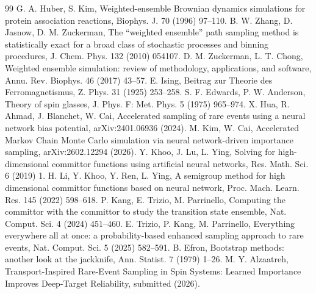 \documentclass[a4paper,fleqn]{cas-sc}
\begin{document}
\begin{thebibliography}{99}
 G. A. Huber, S. Kim, Weighted-ensemble Brownian dynamics
simulations for protein association reactions, Biophys. J. 70 (1996)
97--110.
 B. W. Zhang, D. Jasnow, D. M. Zuckerman, The ``weighted
ensemble'' path sampling method is statistically exact for a broad class of
stochastic processes and binning procedures, J. Chem. Phys. 132 (2010)
054107.
 D. M. Zuckerman, L. T. Chong, Weighted ensemble
simulation: review of methodology, applications, and software, Annu. Rev.
Biophys. 46 (2017) 43--57.
 E. Ising, Beitrag zur Theorie des Ferromagnetismus, Z.
Phys. 31 (1925) 253--258.
 S. F. Edwards, P. W. Anderson, Theory of spin glasses,
J. Phys. F: Met. Phys. 5 (1975) 965--974.
 X. Hua, R. Ahmad, J. Blanchet, W. Cai, Accelerated
sampling of rare events using a neural network bias potential,
arXiv:2401.06936 (2024).
 M. Kim, W. Cai, Accelerated Markov Chain Monte Carlo
simulation via neural network-driven importance sampling, arXiv:2602.12294
(2026).
 Y. Khoo, J. Lu, L. Ying, Solving for high-dimensional
committor functions using artificial neural networks, Res. Math. Sci. 6
(2019) 1.
 H. Li, Y. Khoo, Y. Ren, L. Ying, A semigroup method for
high dimensional committor functions based on neural network, Proc. Mach.
Learn. Res. 145 (2022) 598--618.
 P. Kang, E. Trizio, M. Parrinello, Computing the
committor with the committor to study the transition state ensemble, Nat.
Comput. Sci. 4 (2024) 451--460.
 E. Trizio, P. Kang, M. Parrinello, Everything
everywhere all at once: a probability-based enhanced sampling approach to
rare events, Nat. Comput. Sci. 5 (2025) 582--591.
 B. Efron, Bootstrap methods: another look at the
jackknife, Ann. Statist. 7 (1979) 1--26.
 M. Y. Alzaatreh, Transport-Inspired Rare-Event
Sampling in Spin Systems: Learned Importance Improves Deep-Target
Reliability, submitted (2026). %
\end{thebibliography}
\end{document}
